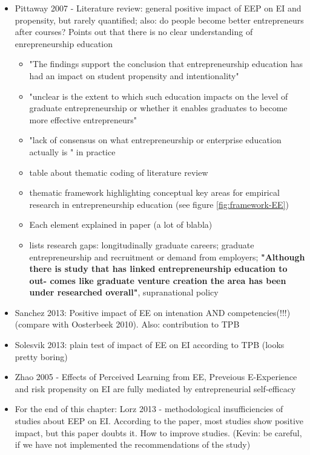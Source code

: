 \begin{itemize}
\item Pittaway 2007 - Literature review: general positive impact of EEP on EI and propensity, but rarely quantified; also: do people become better entrepreneurs after courses? Points out that there is no clear understanding of enrepreneurship education
\begin{itemize}
\item "The findings support the conclusion that entrepreneurship education has had an impact on student propensity and intentionality"
\item "unclear is the extent
to which such education impacts on the level of graduate entrepreneurship or whether it enables graduates to become more effective entrepreneurs"
\item "lack of consensus on what entrepreneurship or enterprise education actually is " in practice
\item table about thematic coding of literature review
\item thematic framework highlighting conceptual key areas for empirical research in entrepreneurship education (see figure \ref{fig:framework-EE})
\item Each element explained in paper (a lot of blabla)
\item lists research gaps: longitudinally graduate careers; graduate entrepreneurship and recruitment or demand from employers; \textbf{"Although there is study that has linked entrepreneurship education to out- comes like graduate venture creation the area has been under researched overall"}, supranational policy
\end{itemize}
\item Sanchez 2013: Positive impact of EE on intenation AND competencies(!!!) (compare with Oosterbeek 2010). Also: contribution to TPB
\item Solesvik 2013: plain test of impact of EE on EI according to TPB (looks pretty boring)

\item Zhao 2005 - Effects of Perceived Learning from EE, Preveious E-Experience and risk propensity on EI are fully mediated by entrepreneurial self-efficacy

\item For the end of this chapter: Lorz 2013 - methodological insufficiencies of studies about EEP on EI. According to the paper, most studies show positive impact, but this paper doubts it. How to improve studies. (Kevin: be careful, if we have not implemented the recommendations of the study)
\end{itemize}


